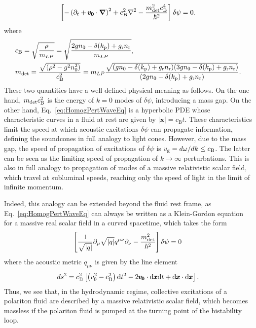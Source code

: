 \begin{equation}
    \left[-\left(\partial_t+\pmb{v_0}\cdot\boldsymbol{\nabla}\right)^2+c_B^2\nabla^2-\frac{m_{\rm det}^2 c_\mathrm{B}^4}{\hbar^2}\right]\delta \psi=0.
    \label{eq:HomogPertWaveEq}
\end{equation}
where 
\begin{equation}\label{eq:csandmdet}
\begin{split}
    &c_\mathrm{B}=\sqrt{\frac{\rho}{\mlp}}=\sqrt{\frac{2gn_0- \delta(k_\tp)+g_\mathrm{r}n_\mathrm{r}}{\mlp}},
    \\%
    &m_{\rm det}=\frac{\sqrt{(\rho^2-g^2n_0^2)}}{c_\mathrm{B}^2}=\mlp\frac{\sqrt{(gn_0- \delta(k_\tp)+g_\mathrm{r}n_\mathrm{r})(3gn_0- \delta(k_\tp)+g_\mathrm{r}n_\mathrm{r})}}{(2gn_0- \delta(k_\tp)+g_\mathrm{r}n_\mathrm{r})}.
\end{split}
\end{equation} 
These two quantities have a well defined physical meaning as follows. On the one hand, $m_{\rm det}c_\mathrm{B}^2$ is the energy of $k=0$ modes of $\delta \psi$, introducing a mass gap. On the other hand, Eq.~\eqref{eq:HomogPertWaveEq} is a hyperbolic PDE whose characteristic curves in a fluid at rest are given by $|\pmb{x}|=c_\mathrm{B} t$. These characteristics limit the speed at which acoustic excitations $\delta \psi$ can propagate information, defining the soundcones in full analogy to light cones. However, due to the mass gap, the speed of propagation of excitations of $\delta \psi$ is $v_{\rm g}=d\omega/dk\leq c_\mathrm{B}$. The latter can be seen as the limiting speed of propagation of $k\to\infty$ perturbations. This is also in full analogy to propagation of modes of a massive relativistic scalar field, which travel at subluminal speeds, reaching only the speed of light in the limit of infinite momentum.

Indeed, this analogy can be extended beyond the fluid rest frame, as Eq.~\eqref{eq:HomogPertWaveEq} can  always be written as a Klein-Gordon equation for a massive real scalar field in a curved spacetime, which takes the form
\begin{equation}
    \left[\frac{1}{\sqrt{|q|}}\partial_\mu\sqrt{|q|}q^{\mu\nu}\partial_\nu-\frac{m_{\rm det}^2}{\hbar^2}\right]\delta \psi=0\,
    \label{eq:KGEqApp}
\end{equation}
where the acoustic metric $q_{\mu\nu}$ is given by the line element
\begin{equation}
    ds^2=c_\mathrm{B}^{2}\left[\left( v_0^2-c_\mathrm{B}^2\right)\dd t^2-2 \pmb{v_0}\cdot\dd \pmb{x} \dd t + \dd\pmb{x}\cdot\dd\pmb{x}\right].
\end{equation}
Thus, we see that, in the hydrodynamic regime, collective excitations of a polariton fluid are described by a massive relativistic scalar field, which becomes massless if the polariton fluid is pumped at the turning point of the bistability loop.


